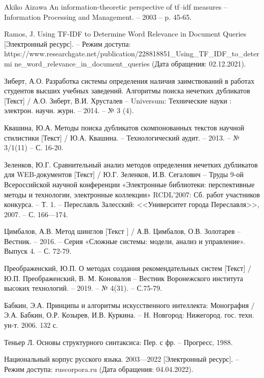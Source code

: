 \begin{thebibliography}{}
	 Akiko Aizawa An information-theoretic perspective of tf–idf measures -- Information Processing and Management. -- 2003 -- p. 45-65.
	
	 Ramos, J. Using TF-IDF to Determine Word Relevance in Document Queries [Электронный ресурс]. -- Режим доступа: https://www.researchgate.net/publication/228818851\_Using\_TF\_IDF\_to\_determi
	ne\_word\_relevance\_in\_document\_queries (Дата обращения: 02.12.2021).
	
	 Зиберт, А.О. Разработка системы определения наличия заимствований в работах студентов высших учебных заведений. Алгоритмы поиска нечетких дубликатов [Текст] / А.О. Зиберт, В.И. Хрусталев --  
	Universum: Технические науки : электрон. научн. журн. -- 2014. -- № 3 (4).
	
	 Квашина, Ю.А. Методы поиска дубликатов скомпонованных текстов научной стилистики [Текст] /  Ю.А. Квашина. -- Технологический аудит. -- 2013. -- № 3/1(11) -- С. 16-20.
	
	 Зеленков, Ю.Г. Сравнительный анализ методов определения нечетких дубликатов для WEB-документов [Текст] / Ю.Г. Зеленков, И.В. Сегалович -- Труды 9-ой Всероссийской научной конференции «Электронные библиотеки: перспективные методы и технологии, электронные коллекции» RCDL'2007: Сб. работ участников конкурса. -- Т. 1. -- Переславль Залесский: <<Университет города Переславля>>, 2007. -- С. 166—174.
	
	 Цимбалов, А.В. Метод шинглов [Текст
	] / А.В. Цимбалов, О.В. Золотарев -- Вестник. -- 2016. -- Серия «Сложные системы: модели, анализ и управление». Выпуск 4. -- С. 72-79.
	
	 Преображенский, Ю.П. О методах создания рекомендательных систем [Текст] / Ю.П. Преображенский, В. М. Коновалов -- Вестник Воронежского института высоких технологий. -- 2019. -- № 4(31). -- С.75-79.
	
	 Бабкин, Э.А. Принципы и алгоритмы искусственного интеллекта:	Монография / Э.А. Бабкин, О.Р. Козырев, И.В. Куркина. – Н. Новгород: Нижегород. гос. техн. ун-т. 2006. 132 с. 
	
	 Теньер Л. Основы структурного синтаксиса: Пер. с фр. – Прогресс, 1988.
	
	 Национальный корпус русского языка. 2003—2022 [Электронный ресурс]. -- Режим доступа: ruscorpora.ru (Дата обращения: 04.04.2022).
	

\end{thebibliography}

